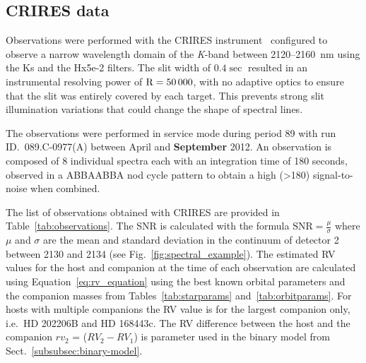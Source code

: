 \documentclass[fleqn,usenatbib]{mnras}
\begin{document}
\subsection{CRIRES data}
\label{subsec:CRIRES}
Observations were performed with the CRIRES instrument~\citep{kaeufl_crires_2004} configured to observe a narrow wavelength domain of the \textit{K}-band between 2120--2160~nm using the {Ks} and the {Hx5e-2} filters. The slit width of \(0.4\sec\) resulted in an instrumental resolving power of \(\rm R=50\,000\), with no adaptive optics to ensure that the slit was entirely covered by each target. This prevents strong slit illumination variations that could change the shape of spectral lines.

The observations were performed in service mode during period 89 with run ID.~089.C-0977(A) between April and \textbf{September} 2012. An observation is composed of 8 individual spectra each with an integration time of 180 seconds, observed in a ABBAABBA nod cycle pattern to obtain a high (>180) signal-to-noise when combined.

{The list of observations obtained with CRIRES are provided in Table~\ref{tab:observations}.  The SNR is calculated with the formula \(\textrm{SNR} = \frac{\mu}{\sigma}\) where $\mu$ and $\sigma$ are the mean and standard deviation in the continuum of detector 2 between 2130 and 2134 (see Fig.~\ref{fig:spectral_example}).
The estimated RV values for the host and companion at the time of each observation are calculated using Equation~\ref{eq:rv_equation} using the best known orbital parameters and the companion masses from Tables~\ref{tab:starparams} and~\ref{tab:orbitparams}. For hosts with multiple companions the RV value is for the largest companion only, i.e.\ {HD 202206}B and {HD 168443}c. The RV difference between the host and the companion \(rv_2\) = (\(RV_2 - RV_1\)) is parameter used in the binary model from Sect.~\ref{subsubsec:binary-model}. }


\end{document}
